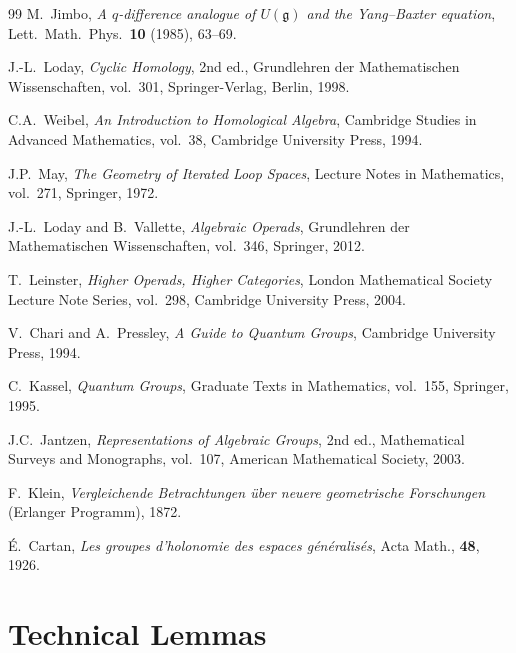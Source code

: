 \documentclass[11pt,a4paper,openany]{book}
\theoremstyle{plain}
\theoremstyle{definition}
\begin{document}
\begin{thebibliography}{99}
M.~Jimbo, \emph{A $q$-difference analogue of $U(\mathfrak{g})$ and the Yang--Baxter equation}, Lett.\ Math.\ Phys.\ \textbf{10} (1985), 63--69.

J.-L.~Loday, \emph{Cyclic Homology}, 2nd ed., Grundlehren der Mathematischen Wissenschaften, vol.~301, Springer-Verlag, Berlin, 1998.

C.A.~Weibel, \emph{An Introduction to Homological Algebra}, Cambridge Studies in Advanced Mathematics, vol.~38, Cambridge University Press, 1994.

J.P.~May, \emph{The Geometry of Iterated Loop Spaces}, Lecture Notes in Mathematics, vol.~271, Springer, 1972.

J.-L.~Loday and B.~Vallette, \emph{Algebraic Operads}, Grundlehren der Mathematischen Wissenschaften, vol.~346, Springer, 2012.

T.~Leinster, \emph{Higher Operads, Higher Categories}, London Mathematical Society Lecture Note Series, vol.~298, Cambridge University Press, 2004.

V.~Chari and A.~Pressley, \emph{A Guide to Quantum Groups}, Cambridge University Press, 1994.

C.~Kassel, \emph{Quantum Groups}, Graduate Texts in Mathematics, vol.~155, Springer, 1995.

J.C.~Jantzen, \emph{Representations of Algebraic Groups}, 2nd ed., Mathematical Surveys and Monographs, vol.~107, American Mathematical Society, 2003.


 F.~Klein, \emph{Vergleichende Betrachtungen \"uber neuere geometrische Forschungen} (Erlanger Programm), 1872.

 É.~Cartan, \emph{Les groupes d'holonomie des espaces g\'en\'eralis\'es}, Acta Math., \textbf{48}, 1926.

\end{thebibliography}



\appendix

\chapter{Technical Lemmas}
\label{app:lemmas}
\end{document}
